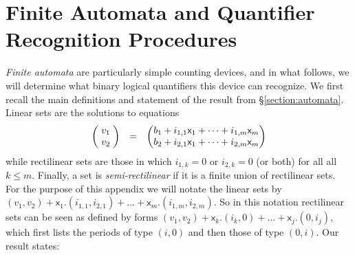 \documentclass[12pt,oneside,reqno]{amsart}
\theoremstyle{definition}
\newtheorem{definition}{Definition}
\begin{document}
\section{Finite Automata and Quantifier Recognition Procedures} \label{app:automata}
 \emph{Finite automata} are particularly simple counting devices, and in what follows, we will  determine what binary logical quantifiers this device can recognize. We first recall the main definitions and statement of the result from \S\ref{section:automata}. Linear sets are the solutions to equations 
\begin{equation}
 \begin{pmatrix}
\;v_1\;  \\
v_2
\end{pmatrix} \hspace{.1in} = \hspace{.1in}
 \begin{pmatrix}
b_1   +  i_{1,1}\mathsf{x}_1+ \dots + i_{1,m}\mathsf{x}_m   \\
b_2   +  i_{2,1}\mathsf{x}_1+ \dots + i_{2,m}\mathsf{x}_m
\end{pmatrix}
\end{equation} while rectilinear sets are those in which $i_{1,k} = 0$ or $i_{2,k}=0$  (or both) for all all $k \leq m$. %
Finally, a set is \emph{semi-rectilinear} if it is a finite union of rectilinear sets. For the purpose of this appendix we will notate the linear sets by $(v_1,v_2) + \mathsf{x}_1.(i_{1,1},i_{2,1})+\dots+\mathsf{x}_m.(i_{1,m},i_{2,m})$. So in this notation rectilinear sets can be seen as defined by forms $(v_1,v_2) + \mathsf{x}_k.(i_k,0) + \dots + \mathsf{x}_j.(0,i_j)$, which first lists the periods of 
type $(i, 0)$ and then those of type $(0, i)$. Our result states: 






\end{document}
